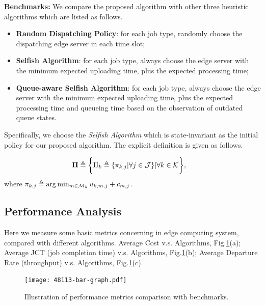 \textbf{Benchmarks:}
We compare the proposed algorithm with other three heuristic algorithms which are listed as follows.
\begin{itemize}
    \item \textbf{Random Dispatching Policy}:
            for each job type, randomly choose the dispatching edge server in each time slot; 
    \item \textbf{Selfish Algorithm}:
            for each job type, always choose the edge server with the minimum expected uploading time, plus the expected processing time;
    \item \textbf{Queue-aware Selfish Algorithm}:
            for each job type, always choose the edge server with the minimum expected uploading time, plus the expected processing time and queueing time based on the observation of outdated queue states.
\end{itemize}
Specifically, we choose the \emph{Selfish Algorithm} which is state-invariant as the initial policy for our proposed algorithm.
The explicit definition is given as follows.
\begin{policy}
    \begin{align}
        \boldsymbol{\Pi} &\triangleq \bigg\{ \Pi_{k}\triangleq\{\pi_{k,j}|\forall j\in\mathcal{J}\} |\forall k\in\mathcal{K} \bigg\},
    \end{align}
    where $\pi_{k,j} \triangleq \arg\min_{m\in\mathcal{M}_{k}} u_{k,m,j} + c_{m,j}$.
\end{policy}

\subsection{Performance Analysis}
\label{subsec:basic}
Here we measure some basic metrics concerning in edge computing system, compared with different algorithms.
Average Cost v.s. Algorithms, Fig.\ref{fig:bar_plot}(a);
Average JCT (job completion time) v.s. Algorithms, Fig.\ref{fig:bar_plot}(b);
Average Departure Rate (throughput) v.s. Algorithms, Fig.\ref{fig:bar_plot}(c).

\begin{figure}[ht]                                                       %
    \centering                                                          %
    \texttt{[image: 48113-bar-graph.pdf]}         %
    \caption{Illustration of performance metrics comparison with benchmarks.}
    \label{fig:bar_plot}                                                %
\end{figure}                                                            %


